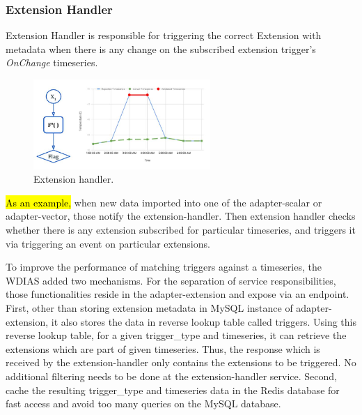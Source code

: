 \subsubsection{Extension Handler}
Extension Handler is responsible for triggering the correct Extension with metadata when there is any change on the subscribed extension trigger's \emph{OnChange} timeseries.
\begin{figure}[htp]
    \centering
    \includegraphics[width=0.6\textwidth]{method/data_preprocess/validation.jpg}
    \caption{Extension handler.}
    \label{fi:extension_handler}
\end{figure}

\hl{As an example,} when new data imported into one of the adapter-scalar or adapter-vector, those notify the extension-handler. Then extension handler checks whether there is any extension subscribed for particular timeseries, and triggers it via triggering an event on particular extensions.

To improve the performance of matching triggers against a timeseries, the WDIAS added two mechanisms. For the separation of service responsibilities, those functionalities reside in the adapter-extension and expose via an endpoint. First, other than storing extension metadata in MySQL instance of adapter-extension, it also stores the data in reverse lookup table called triggers. Using this reverse lookup table, for a given trigger\_type and timeseries, it can retrieve the extensions which are part of given timeseries. Thus, the response which is received by the 
extension-handler only contains the extensions to be triggered. No additional filtering needs to be done at the extension-handler service.
Second, cache the resulting trigger\_type and timeseries data in the  Redis database for fast access and avoid too many queries on the  MySQL database.

